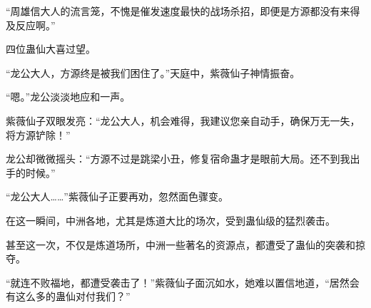 \begin{this_body}
“周雄信大人的流言笼，不愧是催发速度最快的战场杀招，即便是方源都没有来得及反应啊。”

四位蛊仙大喜过望。

“龙公大人，方源终是被我们困住了。”天庭中，紫薇仙子神情振奋。

“嗯。”龙公淡淡地应和一声。

紫薇仙子双眼发亮：“龙公大人，机会难得，我建议您亲自动手，确保万无一失，将方源铲除！”

龙公却微微摇头：“方源不过是跳梁小丑，修复宿命蛊才是眼前大局。还不到我出手的时候。”

“龙公大人……”紫薇仙子正要再劝，忽然面色骤变。

在这一瞬间，中洲各地，尤其是炼道大比的场次，受到蛊仙级的猛烈袭击。

甚至这一次，不仅是炼道场所，中洲一些著名的资源点，都遭受了蛊仙的突袭和掠夺。

“就连不败福地，都遭受袭击了！”紫薇仙子面沉如水，她难以置信地道，“居然会有这么多的蛊仙对付我们？”

\end{this_body}

